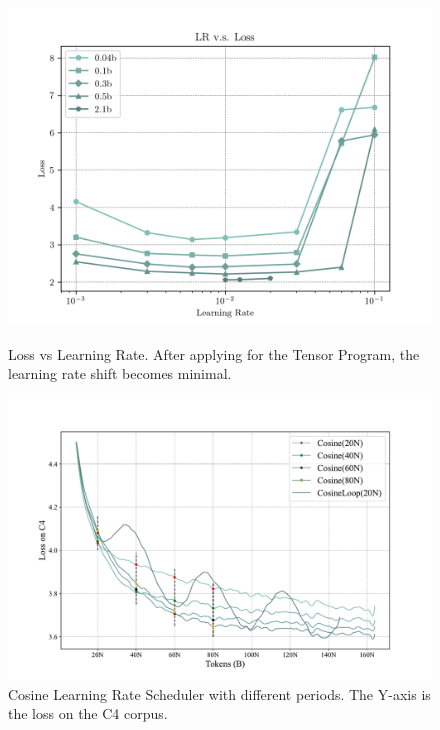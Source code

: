 \vspace{-3mm}
\begin{figure}[htbp]
    \centering
    \begin{minipage}{0.46\linewidth}
        \centering
        \includegraphics[width=0.9\linewidth]{Fig/loss_vs_lr.png}
        \caption{Loss vs Learning Rate. After applying for the Tensor Program, the learning rate shift becomes minimal.}
        \label{fig:loss_vs_lr}
    \end{minipage}
    \hfill %
    \begin{minipage}{0.46\linewidth}
        \centering
        \includegraphics[width=1.0\linewidth]{Fig/cosine_2024-03-26_15-36-16.pdf}
        \caption{Cosine Learning Rate Scheduler with different periods. The Y-axis is the loss on the C4 corpus.}
        \label{fig:cosine_lr}
        \vspace{0.47cm}
    \end{minipage}
\end{figure}
\vspace{-5mm}

